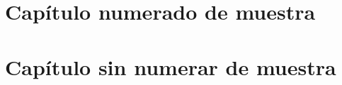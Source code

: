 \documentclass[10pt]{book}
\begin{document}
\chapter{Capítulo numerado de muestra}
\lipsum
\chapter*{Capítulo sin numerar de muestra}
\lipsum
\end{document}

